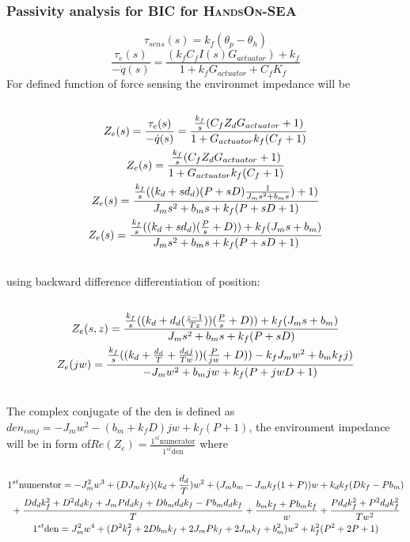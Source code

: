\documentclass[a4paper,12pt]{article}
\begin{document}
\subsubsection{Passivity analysis for BIC for \textsc{HandsOn-SEA}}
\begin{equation}
\tau_{sens}(s)=k_f(\theta_p-\theta_h)
\end{equation}
\begin{equation}
\frac{\tau_e(s)}{-\Dot{q}(s)}=\frac{(k_fC_fI(s)G_{actuator})+k_f}{1+k_fG_{actuator}+C_fK_f}    
\end{equation}
For defined function of force sensing the environmet impedance will be 
\begin{equation}
\begin{multlined}\\
Z_{e}(s)=\frac{\tau_e(s)}{-\Dot{q}(s)}=\frac{\frac{k_{f}}{s}(C_fZ_{d}G_{actuator}+1)}{1+G_{actuator}k_{f}(C_f+1)} \\
Z_{e}(s)=\frac{\frac{k_{f}}{s}(C_fZ_{d}G_{actuator}+1)}{1+G_{actuator}k_{f}(C_f+1)} \\
Z_{e}(s)=\frac{\frac{k_{f}}{s}((k_d+sd_d)(P+sD)\frac{1}{J_ms^2+b_ms})+1)}{J_ms^2+b_ms+k_f(P+sD+1)}\\
Z_{e}(s)=\frac{\frac{k_{f}}{s}((k_d+sd_d)(\frac{P}{s}+D))+k_f(J_ms+b_m)}{J_ms^2+b_ms+k_f(P+sD+1)}\\
\end{multlined}\\
\end{equation}
using backward difference differentiation of position:
\begin{equation}
\begin{multlined}\\
Z_{e}(s,z)=\frac{\frac{k_{f}}{s}((k_d+d_d(\frac{z-1}{Tz}))(\frac{P}{s}+D))+k_f(J_ms+b_m)}{J_ms^2+b_ms+k_f(P+sD)}\\
Z_{e}(jw)=\frac{\frac{k_{f}}{s}((k_d+\frac{d_d}{T}+\frac{d_dj}{Tw}))(\frac{P}{jw}+D))-k_fJ_mw^2+b_mk_fj)}{-J_mw^2+b_mjw+k_f(P+jwD+1)}\\
\end{multlined}\\
\end{equation}
The complex conjugate of the den is defined as $den_{conj}=-J_mw^2-(b_m+k_fD)jw+k_f(P+1)$, the environment impedance will be in form of$Re(Z_{e})=\frac{1^{st} \mathrm{numerator}}{1^{st}\mathrm{den}}$ where\\
\begin{equation}
\begin{multlined}\\
1^{st} \mathrm{numerator}=-J_m^2w^3+(DJ_mk_f)(k_d+\frac{d_d}{T})w^2+(J_mb_m-J_mk_f(1+P))w+k_dk_f(Dk_f-Pb_m)\\+\frac{Dd_dk_f^2+D^2d_dk_f+J_mPd_dk_f+Db_md_dk_f-Pb_md_dk_f}{T}+\frac{b_mk_f+Pb_mk_f}{w}+\frac{Pd_dk_f^2+P^2d_dk_f^2}{Tw^2}\\
1^{st} \mathrm{den}=J_m^2w^4+(D^2k_f^2+2Db_mk_f+2J_mPk_f+2J_mk_f+b_m^2)w^2+k_f^2(P^2+2P+1)\\
\end{multlined}\\
\end{equation}
\end{document}
